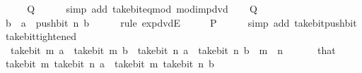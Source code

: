 \begin{isabellebody}
\ \ \isamarkupfalse%
\ \isamarkupfalse%
\ {\isacharquery}{\kern0pt}Q\isanewline
\ \ \ \ \isamarkupfalse%
\ {\isacharparenleft}{\kern0pt}simp\ add{\isacharcolon}{\kern0pt}\ take{\isacharunderscore}{\kern0pt}bit{\isacharunderscore}{\kern0pt}eq{\isacharunderscore}{\kern0pt}mod\ mod{\isacharunderscore}{\kern0pt}{}{\isacharunderscore}{\kern0pt}imp{\isacharunderscore}{\kern0pt}dvd{\isacharparenright}{\kern0pt}\isanewline
{}\isamarkupfalse%
\isanewline
\ \ \isamarkupfalse%
\ {\isacharquery}{\kern0pt}Q\isanewline
\ \ \isamarkupfalse%
\ \isamarkupfalse%
\ b\ \ {\isacartoucheopen}a\ {\isacharequal}{\kern0pt}\ push{\isacharunderscore}{\kern0pt}bit\ n\ b{\isacartoucheclose}\isanewline
\ \ \ \ \isamarkupfalse%
\ {\isacharparenleft}{\kern0pt}rule\ exp{\isacharunderscore}{\kern0pt}dvdE{\isacharparenright}{\kern0pt}\isanewline
\ \ \isamarkupfalse%
\ \isamarkupfalse%
\ {\isacharquery}{\kern0pt}P\isanewline
\ \ \ \ \isamarkupfalse%
\ {\isacharparenleft}{\kern0pt}simp\ add{\isacharcolon}{\kern0pt}\ take{\isacharunderscore}{\kern0pt}bit{\isacharunderscore}{\kern0pt}push{\isacharunderscore}{\kern0pt}bit{\isacharparenright}{\kern0pt}\isanewline
{}\isamarkupfalse%
%
\endisatagproof
{\isafoldproof}%
%
\isadelimproof
\isanewline
%
\endisadelimproof
\isanewline
{}\isamarkupfalse%
\ take{\isacharunderscore}{\kern0pt}bit{\isacharunderscore}{\kern0pt}tightened{\isacharcolon}{\kern0pt}\isanewline
\ \ {\isacartoucheopen}take{\isacharunderscore}{\kern0pt}bit\ m\ a\ {\isacharequal}{\kern0pt}\ take{\isacharunderscore}{\kern0pt}bit\ m\ b{\isacartoucheclose}\ \ {\isacartoucheopen}take{\isacharunderscore}{\kern0pt}bit\ n\ a\ {\isacharequal}{\kern0pt}\ take{\isacharunderscore}{\kern0pt}bit\ n\ b{\isacartoucheclose}\ \ {\isacartoucheopen}m\ {\isasymle}\ n{\isacartoucheclose}\ \isanewline
%
\isadelimproof
%
\endisadelimproof
%
\isatagproof
{}\isamarkupfalse%
\ {\isacharminus}{\kern0pt}\isanewline
\ \ \isamarkupfalse%
\ that\ \isamarkupfalse%
\ {\isacartoucheopen}take{\isacharunderscore}{\kern0pt}bit\ m\ {\isacharparenleft}{\kern0pt}take{\isacharunderscore}{\kern0pt}bit\ n\ a{\isacharparenright}{\kern0pt}\ {\isacharequal}{\kern0pt}\ take{\isacharunderscore}{\kern0pt}bit\ m\ {\isacharparenleft}{\kern0pt}take{\isacharunderscore}{\kern0pt}bit\ n\ b{\isacharparenright}{\kern0pt}{\isacartoucheclose}\isanewline

\end{isabellebody}
